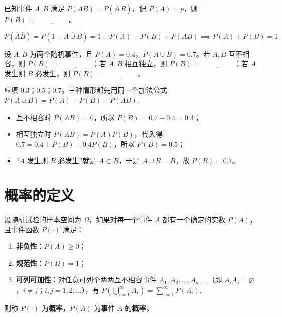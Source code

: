 \documentclass[lang=cn,11pt]{elegantbook}
\begin{document}
\begin{exercise}\label{exer:1-32}
已知事件 \(A,B\) 满足 \(P(AB)=P(\overline{A}\,\overline{B})\)，记 \(P(A)=p\)，则 \(P(B)=\underline{\hspace{2cm}}\)。
\end{exercise}

\begin{solution}
\[
P(\overline{A}\overline{B})=P(1-\overline{A\cup B})=1-P(A)-P(B)+P(AB)\implies P(A)+P(B)=1
\]
\end{solution}

\begin{exercise}\label{exer:1-34}
设 \(A,B\) 为两个随机事件，且 \(P(A)=0.4\)，\(P(A\cup B)=0.7\)。若 \(A,B\) 互不相容，则 \(P(B)=\underline{\hspace{2cm}}\)；若 \(A,B\) 相互独立，则 \(P(B)=\underline{\hspace{2cm}}\)；若 \(A\) 发生则 \(B\) 必发生，则 \(P(B)=\underline{\hspace{2cm}}\)。
\end{exercise}

\begin{solution}
应填 \(0.3\)；\(0.5\)；\(0.7\)。三种情形都先用同一个加法公式
\(
P(A\cup B)=P(A)+P(B)-P(AB).
\)
\begin{itemize}
    \item 互不相容时 \(P(AB)=0\)，所以 \(P(B)=0.7-0.4=0.3\)；
    \item 相互独立时 \(P(AB)=P(A)P(B)\)，代入得 \(0.7=0.4+P(B)-0.4P(B)\)，所以 \(P(B)=0.5\)；
    \item “\(A\) 发生则 \(B\) 必发生”就是 \(A\subset B\)，于是 \(A\cup B=B\)，故 \(P(B)=0.7\)。
\end{itemize}
\end{solution}



\section{概率的定义}

\begin{definition}[概率的公理化定义] \label{def:probability-axiom}
设随机试验的样本空间为 \(\Omega\)，如果对每一个事件 \(A\) 都有一个确定的实数 \(P(A)\)，且事件函数 \(P(\cdot)\) 满足：
\begin{enumerate}
    \item \textbf{非负性}：\(P(A) \ge 0\)；
    \item \textbf{规范性}：\(P(\Omega) = 1\)；
    \item \textbf{可列可加性}：对任意可列个两两互不相容事件 \(A_1, A_2, \dots, A_n, \dots\)（即 \(A_i A_j = \varnothing\)，\(i \neq j\)；\(i, j = 1, 2, \dots\)），有
    \(
    P\!\left(\bigcup_{i=1}^{\infty} A_i\right) = \sum_{i=1}^{\infty} P(A_i),
    \)
\end{enumerate}
则称 \(P(\cdot)\) 为\textbf{概率}，\(P(A)\) 为事件 \(A\) 的\textbf{概率}。
\end{definition}
\end{document}
